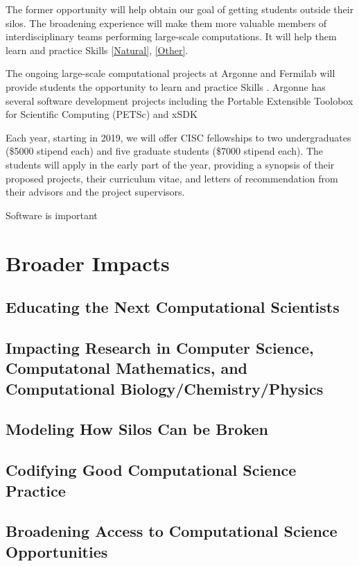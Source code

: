 \documentclass[11pt]{NSFamsart}
\begin{document}
The former opportunity will help obtain our goal of getting students outside their silos.  The broadening experience will make them more valuable members of interdisciplinary teams performing large-scale computations.  It will help them learn and practice Skills \ref{Natural}, \ref{Other}.

The ongoing large-scale computational projects at Argonne and Fermilab will provide students the opportunity to learn and practice Skills .  Argonne has several software development projects including the Portable Extensible Toolobox for Scientific Computing (PETSc) \cite{petsc-web-page17} and xSDK

Each year, starting in 2019, we will offer CISC fellowships to two undergraduates (\$5000 stipend each) and five graduate students (\$7000 stipend each).  The students will apply in the early part of the year, providing a synopsis of their proposed projects, their curriculum vitae, and letters of recommendation from their advisors and the project supervisors.


Software is important \cite{RudEtal18a}

\section{Broader Impacts}

\subsection{Educating the Next Computational Scientists}

\subsection{Impacting Research in Computer Science, Computatonal Mathematics, and Computational Biology/Chemistry/Physics}

\subsection{Modeling How Silos Can be Broken}

\subsection{Codifying Good Computational Science Practice}

\subsection{Broadening Access to Computational Science Opportunities}
\end{document}
